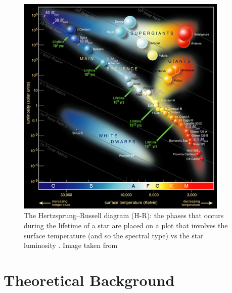 \documentclass[
12pt, %
a4paper, %
oneside, %
headinclude,footinclude, %
BCOR5mm, %
]{scrartcl}
\begin{document}
\begin{figure}[h]
\begin{center}
\includegraphics[width=0.9\textwidth]{Pic/S_T_T_explanation.png}
\caption{The Hertzsprung–Russell diagram (H-R): the phases that occurs during the lifetime of a star are placed on a plot that involves the surface temperature (and so the spectral type) vs the star luminosity .   Image taken from \cite{HR_diagram}}
\label{H_R_diagram}
\end{center}
\end{figure}


\clearpage

\section{Theoretical Background}
\end{document}
